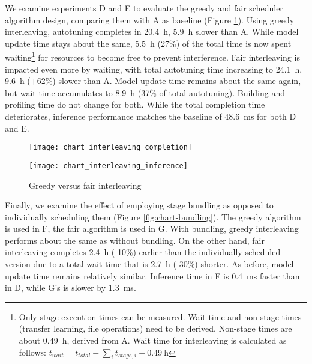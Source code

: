 We examine experiments D and E to evaluate the greedy and fair scheduler algorithm design, comparing them with A as baseline (Figure \ref{fig:chart-interleaving}). Using greedy interleaving, autotuning completes in \SI{20.4}{\hour}, \SI{5.9}{\hour} slower than A. While model update time stays about the same, \SI{5.5}{\hour} (27\%) of the total time is now spent waiting\footnote{Only stage execution times can be measured. Wait time and non-stage times (transfer learning, file operations) need to be derived. Non-stage times are about \SI{0.49}{\hour}, derived from A. Wait time for interleaving is calculated as follows: $t_{wait} = t_{total} - \sum_{i}t_{stage,i} - \SI{0.49}{\hour}$} for resources to become free to prevent interference. Fair interleaving is impacted even more by waiting, with total autotuning time increasing to \SI{24.1}{\hour}, \SI{9.6}{\hour} (+62\%) slower than A. Model update time remains about the same again, but wait time accumulates to \SI{8.9}{\hour} (37\% of total autotuning). Building and profiling time do not change for both. While the total completion time deteriorates, inference performance matches the baseline of \SI{48.6}{\milli\second} for both D and E.

\begin{figure}[t]
	\begin{minipage}[b]{.6\textwidth}
		\centering\texttt{[image: chart\_interleaving\_completion]}
		\label{fig:chart-interleaving-completion}
	\end{minipage}%
	\hfill
	\begin{minipage}[b]{.35\textwidth}
		\centering\texttt{[image: chart\_interleaving\_inference]}
		\label{fig:chart-interleaving-inference}
	\end{minipage}
	\caption[Results of greedy versus fair interleaving]{Greedy versus fair interleaving}
	\label{fig:chart-interleaving}
\end{figure}

Finally, we examine the effect of employing stage bundling as opposed to individually scheduling them (Figure \ref{fig:chart-bundling}). The greedy algorithm is used in F, the fair algorithm is used in G. With bundling, greedy interleaving performs about the same as without bundling. On the other hand, fair interleaving completes \SI{2.4}{\hour} (-10\%) earlier than the individually scheduled version due to a total wait time that is \SI{2.7}{\hour} (-30\%) shorter. As before, model update time remains relatively similar. Inference time in F is \SI{0.4}{\milli\second} faster than in D, while G's is slower by \SI{1.3}{\milli\second}.

